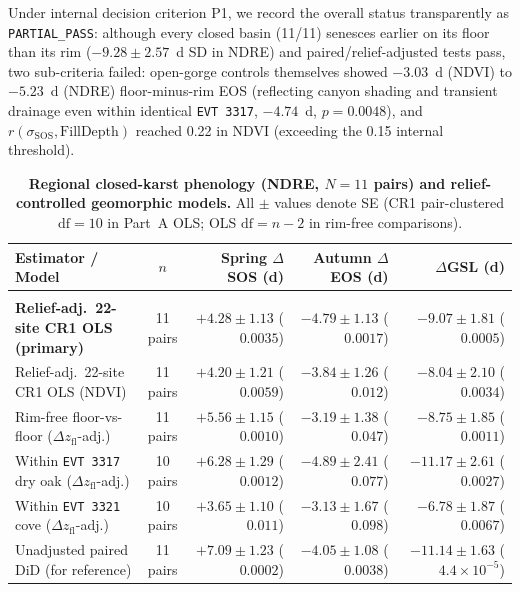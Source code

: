 Under internal decision criterion P1, we record the overall status transparently as \texttt{PARTIAL\_PASS}: although every closed basin (11/11) senesces earlier on its floor than its rim ($-9.28 \pm 2.57$~d SD in NDRE) and paired/relief-adjusted tests pass, two sub-criteria failed: open-gorge controls themselves showed $-3.03$~d (NDVI) to $-5.23$~d (NDRE) floor-minus-rim EOS (reflecting canyon shading and transient drainage even within identical \texttt{EVT 3317}, $-4.74$~d, $p=0.0048$), and $r(\sigma_{\text{SOS}}, \text{FillDepth})$ reached 0.22 in NDVI (exceeding the 0.15 internal threshold).

\begin{table}[t]
\centering
\begin{threeparttable}
\caption{\textbf{Regional closed-karst phenology (NDRE, $N=11$ pairs) and relief-controlled geomorphic models.} All $\pm$ values denote SE (CR1 pair-clustered $\text{df}=10$ in Part~A OLS; OLS $\text{df}=n-2$ in rim-free comparisons).}
\label{tab:karst_census}
\footnotesize
\setlength{\tabcolsep}{4.0pt}
\begin{tabularx}{\linewidth}{@{} >{\raggedright\arraybackslash}X c r r r @{}}
\toprule
Estimator / Model & $n$ & Spring $\Delta$SOS (d) & Autumn $\Delta$EOS (d) & $\Delta$GSL (d) \\
\midrule
\multicolumn{5}{@{}l}{\textit{Part A: Closed-Karst vs.\ Open-Gorge Effects (NDRE)}} \\
\textbf{Relief-adj.\ 22-site CR1 OLS (primary)} & 11 pairs & $+4.28 \pm 1.13$ ($0.0035$) & $-4.79 \pm 1.13$ ($0.0017$) & $\mathbf{-9.07 \pm 1.81}$ ($0.0005$) \\
Relief-adj.\ 22-site CR1 OLS (NDVI) & 11 pairs & $+4.20 \pm 1.21$ ($0.0059$) & $-3.84 \pm 1.26$ ($0.012$) & $-8.04 \pm 2.10$ ($0.0034$) \\
Rim-free floor-vs-floor ($\Delta z_{\text{fl}}$-adj.) & 11 pairs & $+5.56 \pm 1.15$ ($0.0010$) & $-3.19 \pm 1.38$ ($0.047$) & $-8.75 \pm 1.85$ ($0.0011$) \\
Within \texttt{EVT 3317} dry oak ($\Delta z_{\text{fl}}$-adj.) & 10 pairs & $+6.28 \pm 1.29$ ($0.0012$) & $-4.89 \pm 2.41$ ($0.077$) & $-11.17 \pm 2.61$ ($0.0027$) \\
Within \texttt{EVT 3321} cove ($\Delta z_{\text{fl}}$-adj.) & 10 pairs & $+3.65 \pm 1.10$ ($0.011$) & $-3.13 \pm 1.67$ ($0.098$) & $-6.78 \pm 1.87$ ($0.0067$) \\
Unadjusted paired DiD (for reference) & 11 pairs & $+7.09 \pm 1.23$ ($0.0002$) & $-4.05 \pm 1.08$ ($0.0038$) & $-11.14 \pm 1.63$ ($4.4{\times}10^{-5}$) \\

\end{tabularx}
\end{threeparttable}
\end{table}
